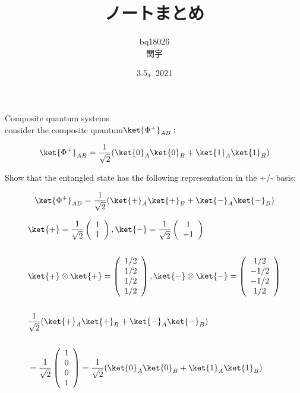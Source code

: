\documentclass[xelatex,ja=standard,jafont=noto]{bxjsarticle}
\title{ノートまとめ}
\author{bq18026\\関宇}
\date{3.5，2021}
\begin{document}
\maketitle


Composite quantum systems\\

consider the composite quantum$\ket{\Phi^{+}}_{AB}:$

\begin{equation}
    \ket{\Phi^{+}}_{AB}=\frac{1}{\sqrt{2}}(\ket{0}_{A}\ket{0}_{B}+\ket{1}_{A}\ket{1}_{B})
\end{equation}

Show that the entangled state has the following representation in
the +/- basis:

\begin{equation}
    \ket{\Phi^{+}}_{AB}=\frac{1}{\sqrt{2}}(\ket{+}_{A}\ket{+}_{B}+\ket{-}_{A}\ket{-}_{B})
\end{equation}

\begin{equation}
    \begin{aligned}
    &\ket{+}=\frac{1}{\sqrt{2}}\left(\begin{array}{c} 
    1  \\ 
    1
\end{array}\right),\ket{-}=\frac{1}{\sqrt{2}}\left(\begin{array}{c} 
    1  \\ 
    -1
\end{array}\right)\\
\\
&\ket{+}\otimes\ket{+}=\left(\begin{array}{c} 
   1/2  \\ 
    1/2 \\
     1/2  \\
    1/2  
\end{array}\right),\ket{-}\otimes\ket{-}=\left(\begin{array}{c} 
   1/2  \\ 
    -1/2 \\
     -1/2  \\
    1/2  
\end{array}\right)\\
\\
&\frac{1}{\sqrt{2}}(\ket{+}_{A}\ket{+}_{B}+\ket{-}_{A}\ket{-}_{B})\\
\\
&=\frac{1}{\sqrt{2}}\left(\begin{array}{c} 
   1 \\ 
    0 \\
     0  \\
    1  
\end{array}\right)=\frac{1}{\sqrt{2}}(\ket{0}_{A}\ket{0}_{B}+\ket{1}_{A}\ket{1}_{B})
    \end{aligned}
\end{equation}
\end{document}

